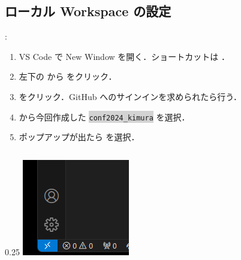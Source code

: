 \documentclass[aspectratio=169,dvipdfmx,cjk]{beamer}
\newcommand{\cmdline}[1]{
    \colorbox{lightgray}{\lstinline[style=command]{#1}}
}
\begin{document}
\subsection{ローカル Workspace の設定}
\begin{frame}{\insertsection \thesubsection: \insertsubsection}
  \begin{enumerate}
    \item VS Code で New Window を開く．ショートカットは ．
    \item 左下の\beamerbutton{$><$} から  をクリック．
    \item {} をクリック．GitHub へのサインインを求められたら行う\cite{GitHubAuthentication}．
    \item {} から今回作成した \cmdline{conf2024_kimura} を選択．
    \item ポップアップが出たら  を選択．
  \end{enumerate}
  \begin{columns}
    \begin{column}{0.25\textwidth}
        \includegraphics[width=1.0\linewidth]{fig/connect.png}
    \end{column}
    \begin{column}{0.3\textwidth}

\end{column}
\end{columns}
\end{frame}
\end{document}
